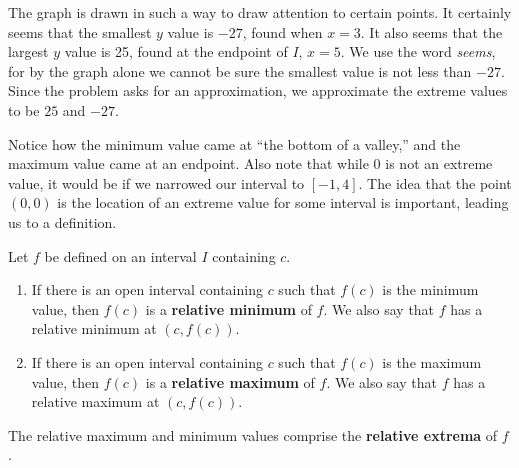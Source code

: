 {The graph is drawn in such a way to draw attention to certain points. It certainly seems that the smallest $y$ value is $-27$, found when $x=3$. It also seems that the largest $y$ value is 25, found at the endpoint of $I$, $x=5$. We use the word \textit{seems}, for by the graph alone we cannot be sure the smallest value is not less than $-27$. Since the problem asks for an approximation, we approximate the extreme values to be $25$ and $-27$.}

Notice how the minimum value came at ``the bottom of a valley,'' and the maximum value came at an endpoint. Also note that while $0$ is not an extreme value, it would be if we narrowed our interval to $[-1,4]$. The idea that the point $(0,0)$ is the location of an extreme value for some interval is important, leading us to a definition.

%
{Let $f$ be defined on an interval $I$ containing $c$. 
\begin{enumerate}
	\item	If there is an open interval containing $c$ such that $f(c)$ is the minimum value, then $f(c)$ is a \textbf{relative minimum} of $f$. We also say that $f$ has a relative minimum at $(c,f(c))$.
	\item	If there is an open interval containing $c$ such that $f(c)$ is the maximum value, then $f(c)$ is a \textbf{relative maximum} of $f$. We also say that $f$ has a relative maximum at $(c,f(c))$.
\end{enumerate}

The relative maximum and minimum values comprise the \textbf{relative extrema} of $f$.}

